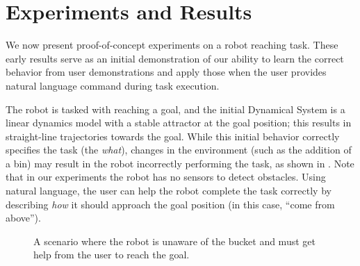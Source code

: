\section{Experiments and Results}
\label{sec:results}

We now present proof-of-concept experiments on a robot reaching task.
These early results serve as an initial demonstration of our ability to learn the correct behavior from user demonstrations and apply those when the user provides natural language command during task execution.

The robot is tasked with reaching a goal, and the initial Dynamical System is a linear dynamics model with a stable attractor at the goal position; this results in straight-line trajectories towards the goal.
While this initial behavior correctly specifies the task (the \emph{what}), changes in the environment (such as the addition of a bin) may result in the robot incorrectly performing the task, as shown in . Note that in our experiments the robot has no sensors to detect obstacles.
Using natural language, the user can help the robot complete the task correctly by describing \emph{how} it should approach the goal position (in this case, ``come from above'').


\begin{figure}[t]
  \centering
  \caption{
    A scenario where the robot is unaware of the bucket and must get help from the user to reach the goal.
  }
  \label{figBucket}
\end{figure}

